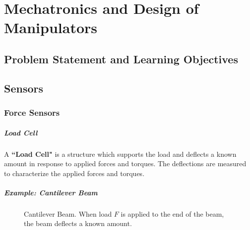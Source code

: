 %

\chapter{Mechatronics and Design of Manipulators}

\section{Problem Statement and Learning Objectives}

%

\section{Sensors}

\subsection{Force Sensors}

\paragraph{Load Cell}
\begin{indent}
A {\bf ``Load Cell" } is a structure which supports the load
and deflects a known amount in response to applied forces
and torques.  The deflections are measured to characterize
the applied forces and torques.
\end{indent}


\paragraph{Example: Cantilever Beam}

\begin{figure}[ht]	%
\begin{center}
\caption{Cantilever Beam.  When load $F$ is applied	%
to the end of the beam, the beam deflects a known amount. }	%
\end{center}
\end{figure}	%


